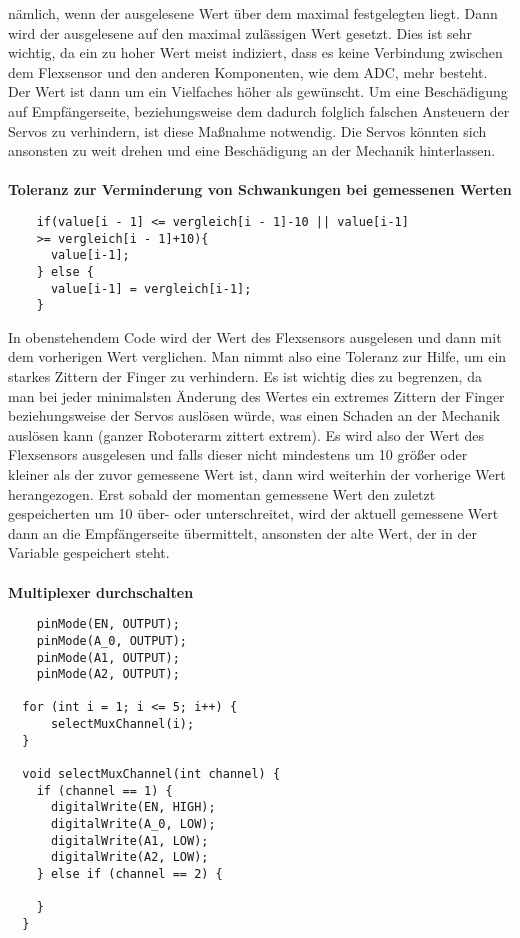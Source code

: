 \documentclass[titlepage,12pt,twoside]{article}
\begin{document}
nämlich, wenn der ausgelesene Wert über dem maximal festgelegten liegt. Dann wird 
der ausgelesene auf den maximal zulässigen Wert gesetzt. Dies ist sehr wichtig, da 
ein zu hoher Wert meist indiziert, dass es keine Verbindung zwischen dem Flexsensor 
und den anderen Komponenten, wie dem ADC, mehr besteht. Der Wert ist dann um ein 
Vielfaches höher als gewünscht. Um eine Beschädigung auf Empfängerseite, beziehungsweise 
dem dadurch folglich falschen Ansteuern der Servos zu verhindern, ist diese Maßnahme 
notwendig. Die Servos könnten sich ansonsten zu weit drehen und eine Beschädigung an 
der Mechanik hinterlassen. \\
\\
\textbf{Toleranz zur Verminderung von Schwankungen bei gemessenen Werten} \\
\footnotesize
\begin{lstlisting}
    if(value[i - 1] <= vergleich[i - 1]-10 || value[i-1]
	>= vergleich[i - 1]+10){
      value[i-1];
    } else {
      value[i-1] = vergleich[i-1];
    }
\end{lstlisting}
\hfill \break
\normalsize
In obenstehendem Code wird der Wert des Flexsensors ausgelesen und dann mit dem 
vorherigen Wert verglichen. Man nimmt also eine Toleranz zur Hilfe, um ein starkes 
Zittern der Finger zu verhindern. Es ist wichtig dies zu begrenzen, da man bei jeder 
minimalsten Änderung des Wertes ein extremes Zittern der Finger beziehungsweise der 
Servos auslösen würde, was einen Schaden an der Mechanik auslösen kann (ganzer 
Roboterarm zittert extrem). Es wird also der Wert des Flexsensors ausgelesen und falls 
dieser nicht mindestens um 10 größer oder kleiner als der zuvor gemessene Wert ist, dann 
wird weiterhin der vorherige Wert herangezogen. Erst sobald der momentan gemessene Wert 
den zuletzt gespeicherten um 10 über- oder unterschreitet, wird der aktuell gemessene 
Wert dann an die Empfängerseite übermittelt, ansonsten der alte Wert, der in der 
Variable  gespeichert steht. \\
\\
\newpage
\textbf{Multiplexer durchschalten} \\
\footnotesize
\begin{lstlisting}
	pinMode(EN, OUTPUT);
	pinMode(A_0, OUTPUT);
	pinMode(A1, OUTPUT);
	pinMode(A2, OUTPUT);
  
  for (int i = 1; i <= 5; i++) {
	  selectMuxChannel(i);
  }
  
  void selectMuxChannel(int channel) {
	if (channel == 1) {
	  digitalWrite(EN, HIGH);
	  digitalWrite(A_0, LOW);
	  digitalWrite(A1, LOW);
	  digitalWrite(A2, LOW);
	} else if (channel == 2) {
	  
	}
  }
\end{lstlisting}
\end{document}
